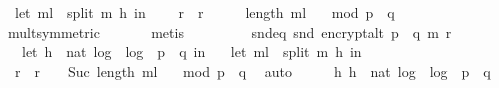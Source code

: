 \begin{isabellebody}
\ \ let\ m{\isacharunderscore}{\kern0pt}l\ {\isacharequal}{\kern0pt}\ split\ m\ h\ in\ \ \isanewline
\ \ {\isacharparenleft}{\kern0pt}{\isacharparenleft}{\kern0pt}r\ {\isacharasterisk}{\kern0pt}\ r{\isacharparenright}{\kern0pt}\ {\isacharcircum}{\kern0pt}\ {\isacharparenleft}{\kern0pt}{}\ {\isacharasterisk}{\kern0pt}\ {}\ {\isacharcircum}{\kern0pt}\ {\isacharparenleft}{\kern0pt}length\ m{\isacharunderscore}{\kern0pt}l{\isacharparenright}{\kern0pt}{\isacharparenright}{\kern0pt}{\isacharparenright}{\kern0pt}{\isacharparenright}{\kern0pt}\isanewline
\ \ \ mod\ {\isacharparenleft}{\kern0pt}p\ {\isacharasterisk}{\kern0pt}\ q{\isacharparenright}{\kern0pt}{\isachardoublequoteclose}\ \isamarkupfalse%
\ mult{\isacharunderscore}{\kern0pt}{}{\isacharbrackleft}{\kern0pt}symmetric{\isacharbrackright}{\kern0pt}\isanewline
\ \ \ \ \ \isamarkupfalse%
\ metis\isanewline
\isanewline
\ \ \isanewline
\ \ \ \isamarkupfalse%
\ \isamarkupfalse%
\ snd{\isacharunderscore}{\kern0pt}eq{\isacharcolon}{\kern0pt}\ {\isachardoublequoteopen}snd\ {\isacharparenleft}{\kern0pt}encrypt{\isacharunderscore}{\kern0pt}alt\ {\isacharparenleft}{\kern0pt}p\ {\isacharasterisk}{\kern0pt}\ q{\isacharparenright}{\kern0pt}\ m\ r{\isacharparenright}{\kern0pt}\ \isanewline
\ \ {\isacharequal}{\kern0pt}\ {\isacharparenleft}{\kern0pt}let\ h\ {\isacharequal}{\kern0pt}\ nat\ {\isasymlfloor}log\ {}\ {\isacharparenleft}{\kern0pt}log\ {}\ {\isacharparenleft}{\kern0pt}p\ {\isacharasterisk}{\kern0pt}\ q{\isacharparenright}{\kern0pt}{\isacharparenright}{\kern0pt}{\isasymrfloor}\ in\ \isanewline
\ \ let\ m{\isacharunderscore}{\kern0pt}l\ {\isacharequal}{\kern0pt}\ split\ m\ h\ in\ \ \isanewline
\ \ {\isacharparenleft}{\kern0pt}r\ {\isacharasterisk}{\kern0pt}\ r{\isacharparenright}{\kern0pt}\ {\isacharcircum}{\kern0pt}\ {\isacharparenleft}{\kern0pt}{}\ {\isacharcircum}{\kern0pt}\ {\isacharparenleft}{\kern0pt}Suc\ {\isacharparenleft}{\kern0pt}length\ m{\isacharunderscore}{\kern0pt}l{\isacharparenright}{\kern0pt}{\isacharparenright}{\kern0pt}{\isacharparenright}{\kern0pt}{\isacharparenright}{\kern0pt}\isanewline
\ \ \ mod\ {\isacharparenleft}{\kern0pt}p\ {\isacharasterisk}{\kern0pt}\ q{\isacharparenright}{\kern0pt}{\isachardoublequoteclose}\ \isamarkupfalse%
\ auto\isanewline
\isanewline
\ \ \isamarkupfalse%
\ \isamarkupfalse%
\ {\isachardoublequoteopen}{\isasymexists}h{\isachardot}{\kern0pt}\ h\ {\isacharequal}{\kern0pt}\ nat\ {\isasymlfloor}log\ {}\ {\isacharparenleft}{\kern0pt}log\ {}\ {\isacharparenleft}{\kern0pt}p\ {\isacharasterisk}{\kern0pt}\ q{\isacharparenright}{\kern0pt}{\isacharparenright}{\kern0pt}{\isasymrfloor}{\isachardoublequoteclose}\ \isamarkupfalse%

\end{isabellebody}
